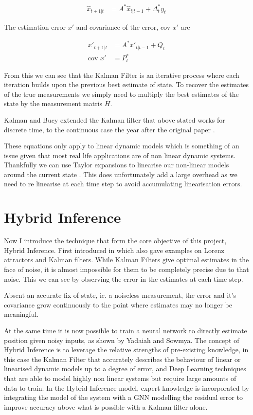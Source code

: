 \documentclass[]{../resources/final_report}
\begin{document}
\begin{align}
  \hat{x}_{t+1|t} &= A^*\hat{x}_{t|t-1} + \Delta^*_ty_t
\end{align}

The estimation error $x'$ and covariance of the error, cov $x'$ are

\begin{align}
  x'_{t+1|t} &= A^*x'_{t|t-1} + Q_t \\
  \text{cov } x' &= P^*_t
\end{align}

From this we can see that the Kalman Filter is an iterative process where each iteration builds upon the previous best estimate of state.
To recover the estimates of the true measurements we simply need to multiply the best estimates of the state by the measurement matris $H$.

Kalman and Bucy extended the Kalman filter that above stated works for discrete time, to the continuous case the year after the original paper \cite{Klmn1961NewRI}.

These equations only apply to linear dynamic models which is something of an issue given that most real life applications are of non linear dynamic systems. Thankfully we can use Taylor expansions to linearise our non-linear models around the current state \cite{ExtendedKalmanNasa}. 
This does unfortunately add a large overhead as we need to re linearise at each time step to avoid accumulating linearisation errors.

\section{Hybrid Inference}

Now I introduce the technique that form the core objective of this project, Hybrid Inference. First introduced in \cite{Satorras2019CombiningGA} which also gave examples on Lorenz attractors and Kalman filters.
While Kalman Filters give optimal estimates in the face of noise, it is almost impossible for them to be completely precise due to that noise. This we can see by observing the error in the estimates at each time step.

Absent an accurate fix of state, ie. a noiseless measurement, the error and it's covariance grow continuously to the point where estimates may no longer be meaningful.

At the same time it is now possible to train a neural network to directly estimate position given noisy inputs, as shown by Yadaiah and Sowmya\cite{NNStateEstimation}. The concept of Hybrid Inference is to leverage the relative strengths of pre-existing knowledge, in this case the Kalman Filter that accurately describes the behaviour of linear or linearised dynamic models up to a degree of error, and Deep Learning techniques that are able to model highly non linear systems but require large amounts of data to train.
In the Hybrid Inference model, expert knowledge is incorporated by integrating the model of the system with a GNN modelling the residual error to improve accuracy above what is possible with a Kalman filter alone.
\end{document}
